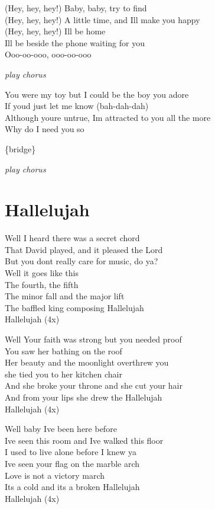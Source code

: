 \documentclass[
  letterpaper,
  a5paper]{memoir}
\begin{document}
(Hey, hey, hey!) Baby, baby, try to find\\
(Hey, hey, hey!) A little time, and I\textquotesingle ll make you
happy\\
(Hey, hey, hey!) I\textquotesingle ll be home\\
I\textquotesingle ll be beside the phone waiting for you\\
Ooo-oo-ooo, ooo-oo-ooo

\emph{play chorus}

You were my toy but I could be the boy you adore\\
If you\textquotesingle d just let me know (bah-dah-dah)\\
Although you\textquotesingle re untrue, I\textquotesingle m attracted to
you all the more\\
Why do I need you so

\{bridge\}

\emph{play chorus}

\hypertarget{hallelujah}{%
\chapter{Hallelujah}\label{hallelujah}}

Well I heard there was a secret chord\\
That David played, and it pleased the Lord\\
But you don\textquotesingle t really care for music, do ya?\\
Well it goes like this\\
The fourth, the fifth\\
The minor fall and the major lift\\
The baffled king composing Hallelujah\\
Hallelujah (4x)

Well Your faith was strong but you needed proof\\
You saw her bathing on the roof\\
Her beauty and the moonlight overthrew you\\
she tied you to her kitchen chair\\
And she broke your throne and she cut your hair\\
And from your lips she drew the Hallelujah\\
Hallelujah (4x)

Well baby I\textquotesingle ve been here before\\
I\textquotesingle ve seen this room and I\textquotesingle ve walked this
floor\\
I used to live alone before I knew ya\\
I\textquotesingle ve seen your flag on the marble arch\\
Love is not a victory march\\
It\textquotesingle s a cold and it\textquotesingle s a broken
Hallelujah\\
Hallelujah (4x)
\end{document}
